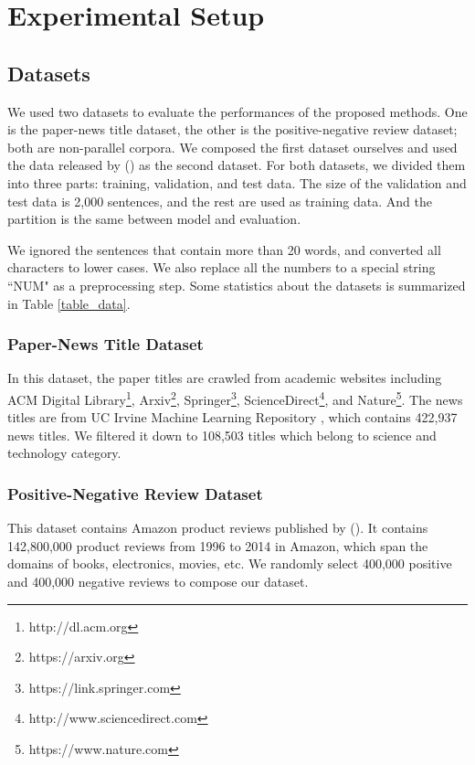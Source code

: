 \documentclass[letterpaper]{article} \usepackage{aaai18}  \usepackage{times}  \usepackage{helvet}  \usepackage{courier}  \usepackage{url}  \usepackage{graphicx}  \usepackage{amsmath}
\newcommand{\newcite}[1]{\citeauthor{#1} (\citeyear{#1})}
\begin{document}
\section{Experimental Setup}


\subsection{Datasets}
We used two datasets to evaluate the performances of the proposed methods. One is the paper-news title dataset, 
the other is the positive-negative review dataset; both are non-parallel corpora. 
We composed the first dataset ourselves and used the data released by \newcite{he2016ups} 
as the second dataset. 
For both datasets, we divided them into three parts: training, validation, and test data. 
The size of the validation and test data is 2,000 sentences, and the rest are used as training data.
And the partition is the same between model and evaluation.
 
We ignored the sentences that contain more than 20 words, 
and converted all characters to lower cases. We also replace all the numbers to a special 
string ``NUM" as a preprocessing step.
Some statistics about the datasets is summarized  in Table \ref{table_data}. 

\subsubsection{Paper-News Title Dataset}
In this dataset, the paper titles are crawled from academic websites including ACM Digital Library\footnote{http://dl.acm.org}, 
Arxiv\footnote{https://arxiv.org}, Springer\footnote{https://link.springer.com}, 
ScienceDirect\footnote{http://www.sciencedirect.com}, and Nature\footnote{https://www.nature.com}. 
The news titles are from UC Irvine Machine Learning Repository \cite{Lichman:2013}, which contains 
422,937 news titles. We filtered it down to 108,503 titles which belong to science and technology category. 

\subsubsection{Positive-Negative Review Dataset}
This dataset contains Amazon product reviews published by \newcite{he2016ups}. 
It contains 142,800,000 product reviews from 1996 to 2014 in Amazon, which span the domains of
books, electronics, movies, etc. 
We randomly select 400,000 positive and 400,000 negative reviews to compose our dataset.
\end{document}
